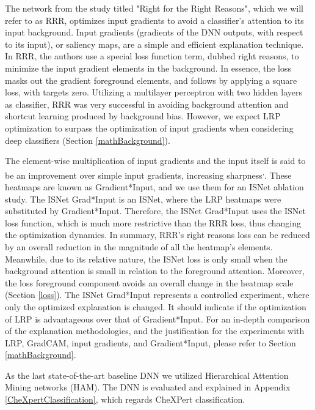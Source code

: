 \documentclass[fleqn,10pt]{wlscirep}
\begin{document}
{The network from the study titled "Right for the Right Reasons"\cite{RRR}, which we will refer to as RRR, optimizes input gradients to avoid a classifier's attention to its input background. Input gradients (gradients of the DNN outputs, with respect to its input), or saliency maps, are a simple and efficient explanation technique. In RRR, the authors use a special loss function term, dubbed right reasons, to minimize the input gradient elements in the background. In essence, the loss masks out the gradient foreground elements, and follows by applying a square loss, with targets zero. Utilizing a multilayer perceptron with two hidden layers as classifier, RRR was very successful in avoiding background attention and shortcut learning produced by background bias\cite{RRR}. However, we expect LRP optimization to surpass the optimization of input gradients when considering deep classifiers (Section \ref{mathBackground}).

The element-wise multiplication of input gradients and the input itself is said to be an improvement over simple input gradients, increasing sharpness\cite{GradInput}\textsuperscript{,}\cite{LRPvsGrad}. These heatmaps are known as Gradient*Input, and we use them for an ISNet ablation study. The ISNet Grad*Input is an ISNet, where the LRP heatmaps were substituted by Gradient*Input. Therefore, the ISNet Grad*Input uses the ISNet loss function, which is much more restrictive than the RRR loss, thus changing the optimization dynamics. In summary, RRR's right reasons loss can be reduced by an overall reduction in the magnitude of all the heatmap's elements. Meanwhile, due to its relative nature, the ISNet loss is only small when the background attention is small in relation to the foreground attention. Moreover, the loss foreground component avoids an overall change in the heatmap scale (Section \ref{loss}). The ISNet Grad*Input represents a controlled experiment, where only the optimized explanation is changed. It should indicate if the optimization of LRP is advantageous over that of Gradient*Input. For an in-depth comparison of the explanation methodologies, and the justification for the experiments with LRP, GradCAM, input gradients, and Gradient*Input, please refer to Section \ref{mathBackground}.

As the last state-of-the-art baseline DNN we utilized Hierarchical Attention Mining networks\cite{HAM} (HAM). The DNN is evaluated and explained in Appendix \ref{CheXpertClassification}, which regards CheXPert classification.


}
\end{document}

